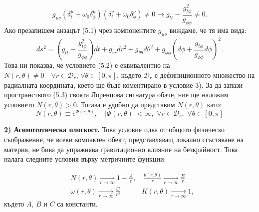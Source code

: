 \begin{equation}
g_{\mu\nu} (\delta_t^\mu + \omega_0\delta^\mu_\phi) (\delta_t^\nu + \omega_0\delta^\nu_\phi) \ne 0 \rightarrow g_{tt} - \frac{g_{t\phi}^2}{g_{\phi\phi}} \ne 0.
\end{equation}\newline
Ако презапишем анзацът (5.1) чрез компонентите $g_{\mu\nu}$ виждаме, че тя има вида:
\begin{equation}
	ds^2 = \left(g_{tt} - \frac{g_{t\phi}^2}{g_{\phi\phi}}\right)dt + g_{rr}dr^2 + g_{\theta\theta}d\theta^2 + g_{\phi\phi}\left(d\phi + \frac{g_{t\phi}}{g_{\phi\phi}}d\phi\right)^2.
\end{equation}
Това ни показва, че условието (5.2) е еквивалентно на $N(r,\theta)\ne 0\quad \forall r\in\mathcal{D}_r,\,\forall \theta\in[0,\pi]$, където $\mathcal{D}_r$ е дефиниционното множество на радиалната координата, което ще бъде коментирано в условие 3). За да запази пространството (5.3) своята Лоренцова сигнатура обаче, ние ще наложим условието $N(r,\theta) > 0$. Тогава е удобно да представим $N(r,\theta)$ като:
\begin{equation}
	N(r,\theta) \equiv e^{\Phi(r,\theta)}, \quad |\Phi(r,\theta)| < \infty,\,\, \forall r\in\mathcal{D}_r,\,\,\forall\theta\in[0,\pi]
\end{equation}

\noindent\textbf{2) Асимптотическа плоскост.} Това условие идва от общото физическо съображение, че всеки компактен обект, представляващ локално сгъстяване на материя, не бива да упражнява гравитационно влияние на безкрайност. Това налага следните условия върху метричните функции:

\begin{equation}
	\begin{aligned}
		&N(r,\theta) \xrightarrow[r\rightarrow\infty]{} 1 - \frac{A}{r},\quad \frac{b(r,\theta)}{r} \xrightarrow[r\rightarrow\infty]{} \frac{B}{r} \\
		&\omega(r,\theta)\xrightarrow[r\rightarrow\infty]{} \frac{C}{r^3}\quad\qquad  K(r,\theta) \xrightarrow[r\rightarrow\infty]{} 1,
	\end{aligned}
\end{equation}
където $A$, $B$ и $C$ са константи.


